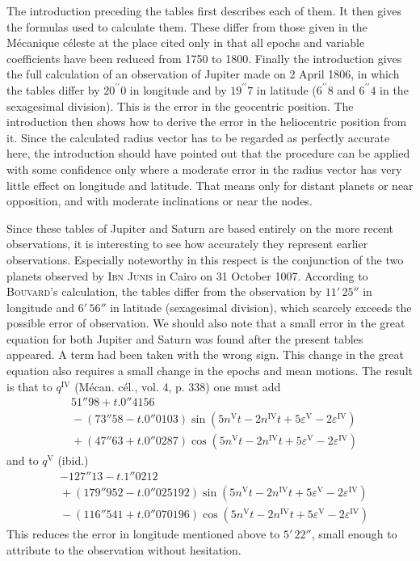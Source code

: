 The introduction preceding the tables first describes each of them. It then gives the formulas used to calculate them. These differ from those given in the Mécanique céleste at the place cited only in that all epochs and variable coefficients have been reduced from 1750 to 1800. Finally the introduction gives the full calculation of an observation of Jupiter made on 2 April 1806, in which the tables differ by $20^{\prime\prime}0$ in longitude and by $19^{\prime\prime}7$ in latitude ($6^{\prime\prime}8$ and $6^{\prime\prime}4$ in the sexagesimal division). This is the error in the geocentric position. The introduction then shows how to derive the error in the heliocentric position from it. Since the calculated radius vector has to be regarded as perfectly accurate here, the introduction should have pointed out that the procedure can be applied with some confidence only where a moderate error in the radius vector has very little effect on longitude and latitude. That means only for distant planets or near opposition, and with moderate inclinations or near the nodes.

Since these tables of Jupiter and Saturn are based entirely on the more recent observations, it is interesting to see how accurately they represent earlier observations. Especially noteworthy in this respect is the conjunction of the two planets observed by \textsc{Ibn Junis} in Cairo on 31 October 1007. According to \textsc{Bouvard}’s calculation, the tables differ from the observation by $11'\,25''$ in longitude and $6'\,56''$ in latitude (sexagesimal division), which scarcely exceeds the possible error of observation. We should also note that a small error in the great equation for both Jupiter and Saturn was found after the present tables appeared. A term had been taken with the wrong sign. This change in the great equation also requires a small change in the epochs and mean motions. The result is that to $q^{\mathrm{IV}}$ (Mécan. cél., vol. 4, p. 338) one must add
\[
\begin{aligned}
&51''98 + t.0''4156\\
&{}- (73''58 - t.0''0103)\sin(5n^{\mathrm{V}}t - 2n^{\mathrm{IV}}t + 5\varepsilon^{\mathrm{V}} - 2\varepsilon^{\mathrm{IV}})\\
&{}+ (47''63 + t.0''0287)\cos(5n^{\mathrm{V}}t - 2n^{\mathrm{IV}}t + 5\varepsilon^{\mathrm{V}} - 2\varepsilon^{\mathrm{IV}})
\end{aligned}
\]
and to $q^{\mathrm{V}}$ (ibid.)
\[
\begin{aligned}
&-127''13 - t.1''0212\\
&{}+ (179''952 - t.0''025192)\sin(5n^{\mathrm{V}}t - 2n^{\mathrm{IV}}t + 5\varepsilon^{\mathrm{V}} - 2\varepsilon^{\mathrm{IV}})\\
&{}- (116''541 + t.0''070196)\cos(5n^{\mathrm{V}}t - 2n^{\mathrm{IV}}t + 5\varepsilon^{\mathrm{V}} - 2\varepsilon^{\mathrm{IV}})
\end{aligned}
\]
This reduces the error in longitude mentioned above to $5'\,22''$, small enough to attribute to the observation without hesitation.

